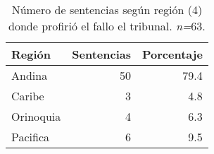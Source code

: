 \begin{table}[!htbp]
\centering
\caption{Número de sentencias según región (4) donde profirió el fallo el tribunal. \textit{n=}63.} 
\label{tab:regfal}
\begin{tabular}{lrr}
  \hline
Región & Sentencias & Porcentaje \\ 
  \hline
Andina & 50 & 79.4 \\ 
  Caribe &  3 & 4.8 \\ 
  Orinoquia &  4 & 6.3 \\ 
  Pacifica &  6 & 9.5 \\ 
   \hline
\end{tabular}
\end{table}

